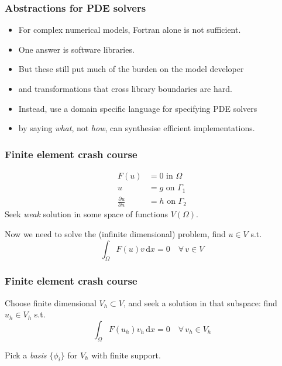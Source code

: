 \documentclass[presentation]{beamer}
\begin{document}
\begin{frame}
  \frametitle{Abstractions for PDE solvers}
  \begin{itemize}
  \item For complex numerical models, Fortran alone is not sufficient.
  \item One answer is software libraries.
  \item But these still put much of the burden on the model developer
  \item and transformations that cross library boundaries are hard.
  \item Instead, use a domain specific language for specifying PDE
    solvers
  \item by saying \emph{what}, not \emph{how}, can synthesise
    efficient implementations.
  \end{itemize}
\end{frame}

\begin{frame}
  \frametitle{Finite element crash course}
  \begin{align*}
    F(u) &= 0 \text{ in $\Omega$}\\
    u &= g \text{ on $\Gamma_1$}\\
    \frac{\partial u}{\partial n} &= h \text{ on $\Gamma_2$}
  \end{align*}
  Seek \emph{weak} solution in some space of functions $V(\Omega)$.

  Now we need to solve the (infinite dimensional) problem, find $u\in V$ s.t.
  \begin{equation*}
    \int_\Omega \!F(u) v\, \text{d}x = 0 \quad \forall\, v \in V
  \end{equation*}
\end{frame}
\begin{frame}
  \frametitle{Finite element crash course}
  Choose finite dimensional $V_h \subset V$, and seek a solution in
  that subspace: find $u_h \in V_h$ s.t.
  \begin{equation*}
    \int_\Omega \!F(u_h) v_h\, \text{d}x = 0 \quad \forall\, v_h \in V_h
  \end{equation*}

  Pick a \emph{basis} $\{\phi_i\}$ for $V_h$ with finite support.
\end{frame}
\end{document}
